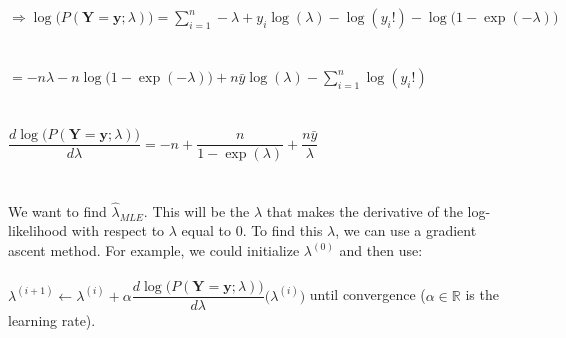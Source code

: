 \documentclass[submit]{harvardml}
\newcommand{\R}{\mathbb{R}}
\begin{document}
$\Rightarrow\log\big(P(\mathbf{Y}=\mathbf{y};\lambda)\big)=\displaystyle\sum_{i=1}^{n}-\lambda+y_i\log(\lambda)-\log(y_i!)-\log(1-\exp(-\lambda)\big)$\\\\\\
$=-n\lambda-n\log\big(1-\exp(-\lambda)\big)+n\bar{y}\log(\lambda)-\displaystyle\sum_{i=1}^{n}\log(y_i!)$\\\\\\
$\dfrac{d\log\big(P(\mathbf{Y}=\mathbf{y};\lambda)\big)}{d\lambda}=-n+\dfrac{n}{1-\exp(\lambda)}+\dfrac{n\bar{y}}{\lambda}$\\\\\\
We want to find $\hat\lambda_{MLE}$. This will be the $\lambda$ that makes the derivative of the log-likelihood with respect to $\lambda$ equal to $0$. To find this $\lambda$, we can use a gradient ascent method. For example, we could initialize $\lambda^{(0)}$ and then use:\\\\
$\lambda^{(i+1)}\leftarrow\lambda^{(i)}+\alpha\dfrac{d\log\big(P(\mathbf{Y}=\mathbf{y};\lambda)\big)}{d\lambda}\big(\lambda^{(i)}\big)$ until convergence ($\alpha\in\R$ is the learning rate).\\\\\\\\
\end{document}
